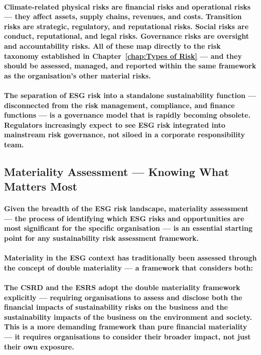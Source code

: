\paragraph{Climate-related physical risks are financial risks and operational risks — they affect assets, supply chains, revenues, and costs. Transition risks are strategic, regulatory, and reputational risks. Social risks are conduct, reputational, and legal risks. Governance risks are oversight and accountability risks. All of these map directly to the risk taxonomy established in Chapter~\ref{chap:Types of Risk} — and they should be assessed, managed, and reported within the same framework as the organisation's other material risks.}
\paragraph{The separation of ESG risk into a standalone sustainability function — disconnected from the risk management, compliance, and finance functions — is a governance model that is rapidly becoming obsolete. Regulators increasingly expect to see ESG risk integrated into mainstream risk governance, not siloed in a corporate responsibility team.}

\subsection{Materiality Assessment — Knowing What Matters Most}
\paragraph{Given the breadth of the ESG risk landscape, \textbf{materiality assessment} — the process of identifying which ESG risks and opportunities are most significant for the specific organisation — is an essential starting point for any sustainability risk assessment framework.}
\paragraph{Materiality in the ESG context has traditionally been assessed through the concept of double materiality — a framework that considers both:}
\begin{itemize}
\end{itemize}
\paragraph{The CSRD and the ESRS adopt the double materiality framework explicitly — requiring organisations to assess and disclose both the financial impacts of sustainability risks on the business and the sustainability impacts of the business on the environment and society. This is a more demanding framework than pure financial materiality — it requires organisations to consider their broader impact, not just their own exposure.}
